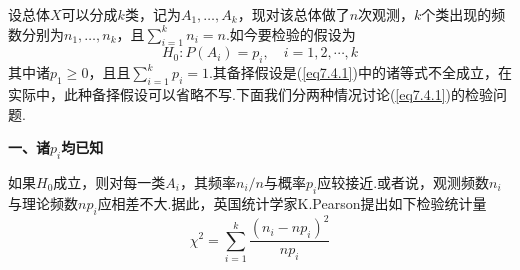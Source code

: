 设总体$X$可以分成$k$类，记为$A_{1},\dotsc,A_{k}$，现对该总体做了$n$次观测，$k$个类出现的频数分别为$n_{1},\dotsc,n_{k}$，且$\sum _ { i = 1 } ^ { k } n _ { i } = n$.如今要检验的假设为
\begin{equation}\label{eq7.4.1}
H _ { 0 } : P \left( A _ { i } \right) = p _ { i } , \quad i = 1,2 , \cdots , k
\end{equation}
其中诸$p_{1}\geq 0$，且且$\sum _ { i = 1 } ^ { k } p _ { i } = 1$.其备择假设是(\ref{eq7.4.1})中的诸等式不全成立，在实际中，此种备择假设可以省略不写.下面我们分两种情况讨论(\ref{eq7.4.1})的检验问题.

\textbf{一、诸$p_{i}$均已知}


如果$H_{0}$成立，则对每一类$A_{i}$，其频率$n_{i}/n$与概率$p_{i}$应较接近.或者说，观测频数$n_{i}$与理论频数$np_{i}$应相差不大.据此，英国统计学家K.Pearson提出如下检验统计量
\begin{equation}\label{eq7.4.2}
\chi ^ { 2 } = \sum _ { i = 1 } ^ { k } \frac { \left( n _ { i } - n p _ { i } \right) ^ { 2 } } { n p _ { i } }
\end{equation}


